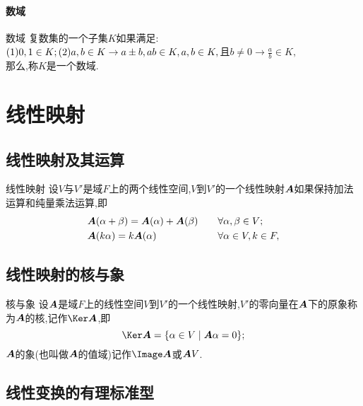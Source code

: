 \documentclass[lang=cn,11pt,normal]{elegantbook}
\begin{document}
	\subsubsection{数域}
	\begin{definition}{数域}{}
		复数集的一个子集$K$如果满足:\\
			$
			(1)0,1\in K;\\
			(2)a,b\in K\rightarrow a\pm b,ab\in K,\\
			a,b\in K,$且$b\ne 0\rightarrow \frac{a}{b}\in K,
			$\\
			那么,称$K$是一个数域.
	\end{definition}
	\chapter{线性映射}
	\section{线性映射及其运算}
	\begin{definition}{线性映射}{}
		设$V$与$V'$是域$F$上的两个线性空间,$V$到$V'$的一个线性映射$\AA$如果保持加法运算和纯量乘法运算,即
		\begin{equation}
			\begin{aligned}
			&\AA(\alpha+\beta)=\AA(\alpha)+\AA(\beta)\quad&&\forall\alpha,\beta\in V;\\
			&\AA(k\alpha)=k\AA(\alpha)&&\forall\alpha\in V,k
			\in F,
			\end{aligned}
		\end{equation}
	\end{definition}
	\section{线性映射的核与象}
	\begin{definition}{核与象}{}
		设$\AA$是域$F$上的线性空间$V$到$V'$的一个线性映射,$V'$的零向量在$\AA$下的原象称为$\AA$的核,记作$\Ker\AA$,即
		\begin{equation}
			\Ker\AA=\{\alpha\in V\;|\;\AA\alpha=0\};
		\end{equation}
		$\AA$的象(也叫做$\AA$的值域)记作$\Image \AA$或$\AA V$.
	\end{definition}
	\section{线性变换的有理标准型}
	
\end{document}
